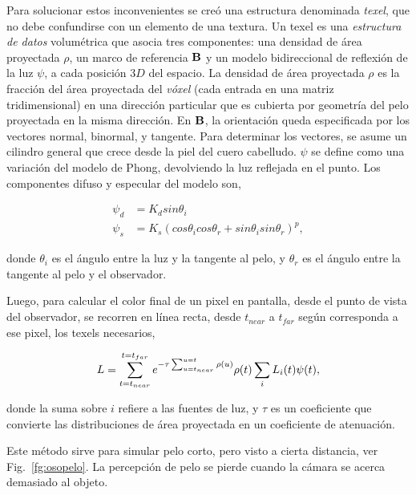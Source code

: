 Para solucionar estos inconvenientes se creó una estructura denominada {\em texel}, que no debe confundirse con un elemento de una textura.
Un texel es una {\em estructura de datos} volumétrica que asocia tres componentes: una densidad de área proyectada $\rho$, un marco de referencia $\bold{B}$ y un modelo bidireccional de reflexión de la luz $\psi$, a cada posición $3D$ del espacio.
La densidad de área proyectada $\rho$ es la fracción del área proyectada del {\em vóxel} (cada entrada en una matriz tridimensional) en una dirección particular que es cubierta por geometría del pelo proyectada en la misma dirección.
En $\bold{B}$, la orientación queda especificada por los vectores normal, binormal, y tangente.
Para determinar los vectores, se asume un cilindro general que crece desde la piel del cuero cabelludo.
$\psi$ se define como una variación del modelo de Phong, devolviendo la luz reflejada en el punto.
Los componentes difuso y especular del modelo son,

\begin{align*}
\psi_{d} &= K_{d} sin \theta_{i}\\
\psi_{s} &= K_{s} (cos \theta_{i} cos \theta_{r} + sin \theta_{i} sin \theta_{r})^{p},
\end{align*}

donde $\theta_{i}$ es el ángulo entre la luz y la tangente al pelo, y $\theta_{r}$ es el ángulo entre la tangente al pelo y el observador.

Luego, para calcular el color final de un pixel en pantalla, desde el punto de vista del observador, se recorren en línea recta, desde $t_{near}$ a $t_{far}$ según corresponda a ese pixel, los texels necesarios,

$$L = \sum_{t=t_{near}}^{t=t_{far}} {e^{-\tau \sum_{u=t_{near}}^{u=t} \rho(u)} \rho(t) \sum_{i} L_{i}(t) \bold{\psi}(t)},$$

donde la suma sobre $i$ refiere a las fuentes de luz, y $\tau$ es un coeficiente que convierte las distribuciones de área proyectada en un coeficiente de atenuación.

Este método sirve para simular pelo corto, pero visto a cierta distancia, ver Fig.~\ref{fg:osopelo}.
La percepción de pelo se pierde cuando la cámara se acerca demasiado al objeto.

